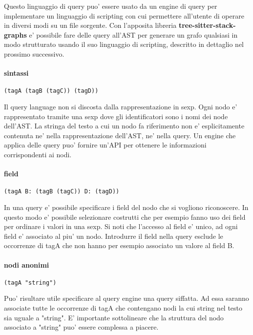 Questo linguaggio di query puo' essere usato da un engine di query per implementare un linguaggio di scripting con cui permettere all'utente di operare in diversi modi su un file sorgente.
Con l'apposita libreria \textbf{tree-sitter-stack-graphs} e' possibile fare delle query all'AST per generare un grafo qualsiasi in modo strutturato usando il suo linguaggio di scripting, descritto in dettaglio nel prossimo successivo.

\paragraph{sintassi}

\begin{verbatim}
(tagA (tagB (tagC)) (tagD))
\end{verbatim}

Il query language non si discosta dalla rappresentazione in sexp.
Ogni nodo e' rappresentato tramite una sexp dove gli identificatori sono i nomi dei node dell'AST.
La stringa del testo a cui un nodo fa riferimento non e' esplicitamente contenuta ne' nella rappresentazione dell'AST, ne' nella query.
Un engine che applica delle query puo' fornire un'API per ottenere le informazioni corrispondenti ai nodi.

\paragraph{field}

\begin{verbatim}
(tagA B: (tagB (tagC)) D: (tagD))
\end{verbatim}

In una query e' possibile specificare i field del nodo che si vogliono riconoscere.
In questo modo e' possibile selezionare costrutti che per esempio fanno uso dei field per ordinare i valori in una sexp.
Si noti che l'accesso al field e' unico, ad ogni field e' associato al piu' un nodo.
Introdurre il field nella query esclude le occorrenze di tagA che non hanno per esempio associato un valore al field B.

\paragraph{nodi anonimi}

\begin{verbatim}
(tagA "string")
\end{verbatim}

Puo' risultare utile specificare al query engine una query siffatta.
Ad essa saranno associate tutte le occorrenze di tagA che contengano nodi la cui string nel testo sia uguale a "string".
E' importante sottolineare che la struttura del nodo associato a "string" puo' essere complessa a piacere.

